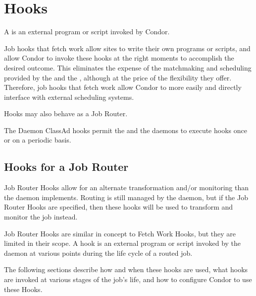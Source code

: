 \section{\label{sec:hooks}Hooks}
A  is an external program or script invoked by Condor.

Job hooks that fetch work allow sites to write their own programs or scripts, 
and allow Condor to invoke these hooks at the right moments 
to accomplish the desired outcome.
This eliminates the expense of the matchmaking and scheduling provided 
by the  and the ,
although at the price of the flexibility they offer. 
Therefore, job hooks that fetch work allow Condor to more easily and directly
interface with external scheduling systems. 

Hooks may also behave as a Job Router.

The Daemon ClassAd hooks permit the  and 
the  daemons to execute hooks once or on a periodic basis.




\subsection{\label{sec:job-hooks-JR-overview}
Hooks for a Job Router}

Job Router Hooks allow for an alternate transformation and/or 
monitoring than the  daemon implements.
Routing is still managed by the  daemon,
but if the Job Router Hooks are specified,
then these hooks will be used to transform
and monitor the job instead.

Job Router Hooks are similar in concept to Fetch Work Hooks,
but they are limited in their scope.
A hook is an external program or script invoked by the 
daemon at various points during the life cycle of a routed job.

The following sections describe how and when these hooks are used,
what hooks are invoked at various stages of the job's life, 
and how to configure Condor to use these Hooks.

